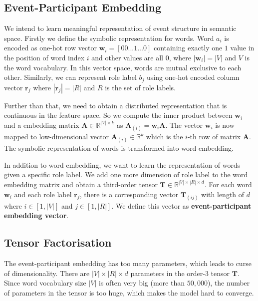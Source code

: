 \documentclass[a4paper]{article}
\begin{document}
\subsection{Event-Participant Embedding} \label{sec:epe}
We intend to learn meaningful representation of event structure in semantic space. Firstly we define the symbolic representation for words. Word $a_i$ is encoded as one-hot row vector $\mathbf{w}_i = [00...1...0]$ containing exactly one $1$ value in the position of word index $i$ and other values are all $0$, where $|\mathbf{w}_i| = |V|$ and $V$ is the word vocabulary. In this vector space, words are mutual exclusive to each other. Similarly, we can represent role label $b_j$ using one-hot encoded column vector $\mathbf{r}_j$ where $|\mathbf{r}_j| = |R|$ and $R$ is the set of role labels. 

Further than that, we need to obtain a distributed representation that is continuous in the feature space. So we compute the inner product between $\mathbf{w}_i$ and a embedding matrix $\mathbf{A} \in \mathbb{R}^{|V| \times k}$ as $\mathbf{A}_{(i)} = \mathbf{w}_i \mathbf{A}$. The vector $\mathbf{w}_i$ is now mapped to low-dimensional vector $\mathbf{A}_{(i)} \in \mathbb{R}^k$ which is the $i$-th row of matrix $\mathbf{A}$. The symbolic representation of words is transformed into word embedding. 

In addition to word embedding, we want to learn the representation of words given a specific role label. We add one more dimension of role label to the word embedding matrix and obtain a third-order tensor $\mathbf{T} \in \mathbb{R}^{|V| \times |R| \times d}$. For each word $\mathbf{w}_i$ and each role label $\mathbf{r}_j$, there is a corresponding vector $\mathbf{T}_{(ij)}$ with length of $d$ where $i \in [1, |V|]$ and $j \in [1, |R|]$. We define this vector as \textbf{event-participant embedding vector}. 


\subsection{Tensor Factorisation} \label{sec:tf}
The event-participant embedding has too many parameters, which leads to curse of dimensionality. There are $|V| \times |R| \times d$ parameters in the order-3 tensor $\mathbf{T}$. Since word vocabulary size $|V|$ is often very big (more than $50,000$), the number of parameters in the tensor is too huge, which makes the model hard to converge. 
\end{document}
